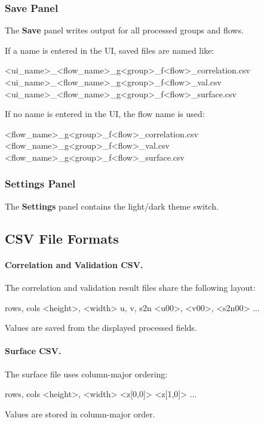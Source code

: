 \documentclass[11pt]{article}
\begin{document}
\subsubsection{Save Panel}

The \textbf{Save} panel writes output for all processed groups and flows.

If a name is entered in the UI, saved files are named like:
\begin{fmtcode}
<ui_name>_<flow_name>_g<group>_f<flow>_correlation.csv
<ui_name>_<flow_name>_g<group>_f<flow>_val.csv
<ui_name>_<flow_name>_g<group>_f<flow>_surface.csv
\end{fmtcode}

If no name is entered in the UI, the flow name is used:
\begin{fmtcode}
<flow_name>_g<group>_f<flow>_correlation.csv
<flow_name>_g<group>_f<flow>_val.csv
<flow_name>_g<group>_f<flow>_surface.csv
\end{fmtcode}

\subsubsection{Settings Panel}

The \textbf{Settings} panel contains the light/dark theme switch.

\subsection{CSV File Formats}

\paragraph{Correlation and Validation CSV.}
The correlation and validation result files share the following layout:
\begin{fmtcode}
rows, cols
<height>, <width>
u, v, s2n
<u00>, <v00>, <s2n00>
...
\end{fmtcode}
Values are saved from the displayed processed fields.

\paragraph{Surface CSV.}
The surface file uses column-major ordering:
\begin{fmtcode}
rows, cols
<height>, <width>
<z[0,0]>
<z[1,0]>
...
\end{fmtcode}
Values are stored in column-major order.
\end{document}
